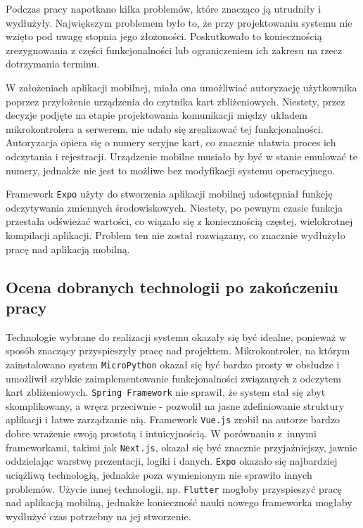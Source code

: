 Podczas pracy napotkano kilka problemów, które znacząco ją utrudniły i wydłużyły. Największym problemem było to, że przy projektowaniu systemu nie wzięto pod uwagę stopnia jego złożoności. Poskutkowało to koniecznością zrezygnowania z części funkcjonalności lub ograniczeniem ich zakresu na rzecz dotrzymania terminu.

W założeniach aplikacji mobilnej, miała ona umożliwiać autoryzację użytkownika poprzez przyłożenie urządzenia do czytnika kart zbliżeniowych. Niestety, przez decyzje podjęte na etapie projektowania komunikacji między układem mikrokontrolera a serwerem, nie udało się zrealizować tej funkcjonalności. Autoryzacja opiera się o numery seryjne kart, co znacznie ułatwia proces ich odczytania i rejestracji. Urządzenie mobilne musiało by być w stanie emulować te numery, jednakże nie jest to możliwe bez modyfikacji systemu operacyjnego.

Framework \texttt{Expo} użyty do stworzenia aplikacji mobilnej udostępniał funkcję odczytywania zmiennych środowiskowych. Niestety, po pewnym czasie funkcja przestała odświeżać wartości, co wiązało się z koniecznością częstej, wielokrotnej kompilacji aplikacji. Problem ten nie został rozwiązany, co znacznie wydłużyło pracę nad aplikacją mobilną.

\subsection{Ocena dobranych technologii po zakończeniu pracy}

Technologie wybrane do realizacji systemu okazały się być idealne, ponieważ w sposób znaczący przyspieszyły pracę nad projektem. Mikrokontroler, na którym zainstalowano system \texttt{MicroPython} okazał się być bardzo prosty w obsłudze i umożliwił szybkie zaimplementowanie funkcjonalności związanych z odczytem kart zbliżeniowych. \texttt{Spring Framework} nie sprawił, że system stał się zbyt skomplikowany, a wręcz przeciwnie - pozwolił na jasne zdefiniowanie struktury aplikacji i łatwe zarządzanie nią. Framework \texttt{Vue.js} zrobił na autorze bardzo dobre wrażenie swoją prostotą i intuicyjnością. W porównaniu z~innymi frameworkami, takimi jak \texttt{Next.js}, okazał się być znacznie przyjaźniejszy, jawnie oddzielając warstwę prezentacji, logiki i danych. \texttt{Expo} okazało się najbardziej uciążliwą technologią, jednakże poza wymienionym nie sprawiło innych problemów. Użycie innej technologii, np. \texttt{Flutter} mogłoby przyspieszyć pracę nad aplikacją mobilną, jednakże konieczność nauki nowego frameworka mogłaby wydłużyć czas potrzebny na jej stworzenie.

